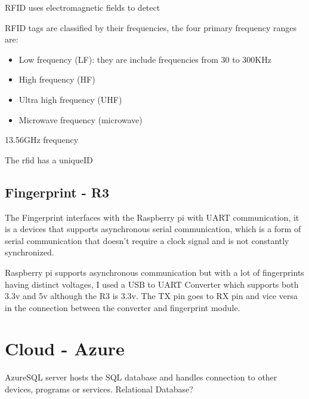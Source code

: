RFID uses electromagnetic fields to detect 

RFID tags are classified by their frequencies, the four primary frequency ranges are:
\begin{itemize}
  \item Low frequency (LF): they are include frequencies from 30 to 300KHz
  \item High frequency (HF)
  \item Ultra high frequency (UHF)
  \item Microwave frequency (microwave)
\end{itemize}

13.56GHz frequency 

The rfid has a uniqueID


\subsection{Fingerprint - R3}
The Fingerprint interfaces with the Raspberry pi with UART communication, it is a devices that supports asynchronous serial communication, which is a form of serial communication that doesn't require a clock signal and is not constantly synchronized. 

Raspberry pi supports asynchronous communication but with a lot of fingerprints having distinct voltages, I used a USB to UART Converter which supports both 3.3v and 5v although the R3 is 3.3v. The TX pin goes to RX pin and vice versa in the connection between the converter and fingerprint module.







\section{Cloud - Azure}
AzureSQL server hosts the SQL database and handles connection to other devices, programs or services. Relational Database?



